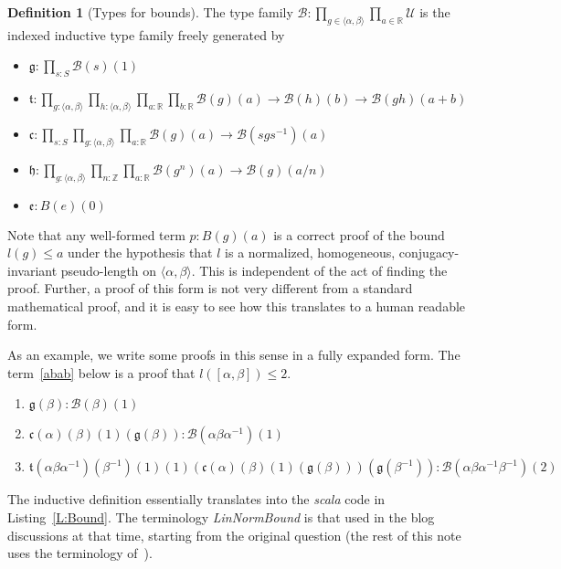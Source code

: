\documentclass{amsart}
\theoremstyle{plain}
\theoremstyle{definition}
\newtheorem{definition}[theorem]{Definition}
\theoremstyle{remark}
\newcommand{\Z}{\mathbb{Z}}
\newcommand{\R}{\mathbb{R}}
\newcommand{\F}{\langle \alpha, \beta \rangle}
\newcommand{\U}{\mathcal{U}}
\newcommand{\g}{\mathfrak{g}}
\renewcommand{\t}{\mathfrak{t}}
\renewcommand{\c}{\mathfrak{c}}
\newcommand{\h}{\mathfrak{h}}
\newcommand{\e}{\mathfrak{e}}
\newcommand{\B}{\mathcal{B}}
\begin{document}
\begin{definition}[Types for bounds]
  The type family $\B: \prod_{g\in \F}\prod_{a \in \R} \U$ is the indexed inductive type family freely generated by
  \begin{itemize}
    \item $\g : \prod_{s: S} \B(s)(1)$
    \item $\t: \prod_{g: \F}\prod_{h: \F}\prod_{a: \R}\prod_{b : \R}\B(g)(a) \to \B(h)(b) \to \B(gh)(a + b)$
    \item $\c : \prod_{s: S}\prod_{g: \F}\prod_{a: \R}\B(g)(a) \to \B(sgs^{-1})(a)$
    \item $\h: \prod_{g: \F}\prod_{n: \Z}\prod_{a: \R}\B(g^n)(a) \to \B(g)(a/n)$
    \item $\e: B(e)(0)$
  \end{itemize}
\end{definition}


Note that any well-formed term $p: B(g)(a)$ is a correct proof of the bound $l(g)\leq a$ under the hypothesis that $l$ is a normalized, homogeneous, conjugacy-invariant pseudo-length on $\F$. This is independent of the act of finding the proof. Further, a proof of this form  is not very different from a standard mathematical proof, and it is easy to see how this translates to a human readable form.

As an example, we write some proofs in this sense in a fully expanded form. The term~\ref{abab} below is a proof that $l([\alpha, \beta]) \leq 2$.
\begin{enumerate}[label=(\alph*)]
  \item $\g(\beta) : \B(\beta)(1)$
  \item $\c(\alpha)(\beta)(1)(\g(\beta)) : \B(\alpha\beta\alpha^{-1})(1)$
  \item\label{abab} $\t(\alpha\beta\alpha^{-1})(\beta^{-1})(1)(1)(\c(\alpha)(\beta)(1)(\g(\beta)))(\g(\beta^{-1})) : \B(\alpha\beta\alpha^{-1}\beta^{-1})(2)$
\end{enumerate}



The inductive definition essentially translates into the \emph{scala} code in Listing~\ref{L:Bound}. The terminology \emph{LinNormBound} is that used in the blog discussions at that time, starting from the original question (the rest of this note uses the terminology of~\cite{polymath}).
\end{document}
